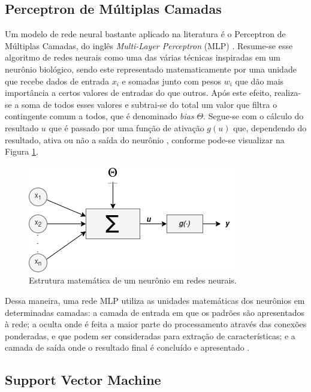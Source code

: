 \documentclass{template/sig-alternate-05-2015}
\begin{document}
      \subsection{Perceptron de Múltiplas Camadas}

      Um modelo de rede neural bastante aplicado na literatura é o
      Perceptron de Múltiplas Camadas, do inglês \textit{Multi-Layer
        Perceptron} (MLP)
      \cite{Hyde:2019,Thabtah:2018,zaji2019application}. Resume-se
      esse algoritmo de redes neurais como uma das várias técnicas
      inspiradas em um neurônio biológico, sendo este representado
      matematicamente por uma unidade que recebe dados de entrada
      $x_i$ e somadas junto com pesos $w_i$ que dão mais importância a
      certos valores de entradas do que outros. Após este efeito,
      realiza-se a soma de todos esses valores e subtrai-se do total
      um valor que filtra o contingente comum a todos, que é
      denominado \textit{bias} $\Theta$. Segue-se com o cálculo do
      resultado $u$ que é passado por uma função de ativação $g(u)$
      que, dependendo do resultado, ativa ou não a saída do neurônio
      \cite{HAYKIN:2001}, conforme pode-se visualizar na Figura
      \ref{fig:mlp1}.

    \begin{figure}[!h]
      \centering
      \includegraphics[width=.4\textwidth]{imagens/neuronio.png}
      \caption{Estrutura matemática de um neurônio em redes neurais.}
      \label{fig:mlp1}
    \end{figure}

    Dessa maneira, uma rede MLP utiliza as unidades matemáticas dos
    neurônios em determinadas camadas: a camada de entrada em que os
    padrões são apresentados à rede; a oculta onde é feita a maior
    parte do processamento através das conexões ponderadas, e que
    podem ser consideradas para extração de características; e a
    camada de saída onde o resultado final é concluído e apresentado
    \cite{zaji2019application}.

    \subsection{Support Vector Machine}
\end{document}
